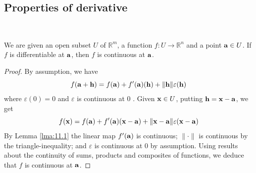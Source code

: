 \documentclass[a4paper,11pt]{article}
\begin{document}
\subsection{Properties of derivative}
\ \vspace*{-1.5em}
\begin{proposition}
    We are given an open subset $U$ of $\mathbb{R}^{m}$, a function $f: U \rightarrow \mathbb{R}^{n}$ and a point ${\bf a} \in U$. If $f$ is differentiable at ${\bf a}$, then $f$ is continuous at ${\bf a}$.
\end{proposition}
\begin{proof}
    By assumption, we have
$$
f({\bf a}+{\bf h})=f({\bf a})+f^{\prime}({\bf a})({\bf h})+\|{\bf h}\| \varepsilon({\bf h})
$$
where $\varepsilon(0)=0$ and $\varepsilon$ is continuous at 0 . Given ${\bf x} \in U$, putting ${\bf h}={\bf x}-{\bf a}$, we get
$$
f({\bf x})=f({\bf a})+f^{\prime}({\bf a})({\bf x}-{\bf a})+\|{\bf x}-{\bf a}\| \varepsilon({\bf x}-{\bf a})
$$
By Lemma \ref{lma:11.1} the linear map $f^{\prime}({\bf a})$ is continuous; $\|\cdot\|$ is continuous by the triangle-inequality; and $\varepsilon$ is continuous at 0 by assumption. Using results about the continuity of sums, products and composites of functions, we deduce that $f$ is continuous at ${\bf a}$.
\end{proof}
\end{document}
